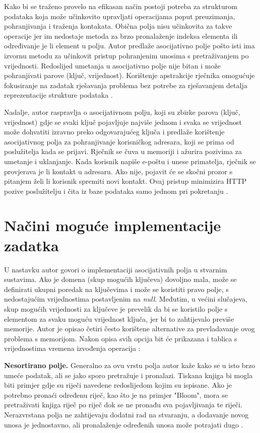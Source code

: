 \documentclass{foi}
\begin{document}
Kako bi se traženo provelo na efikasan način postoji potreba za strukturom podataka koja može učinkovito upravljati operacijama poput preuzimanja, pohranjivanja i traženja kontakata. Obična polja nisu učinkovita za takve operacije jer im nedostaje metoda za brzo pronalaženje indeksa elementa ili određivanje je li element u polju. Autor predlaže asocijativno polje pošto isti ima izvornu metodu za učinkovit pristup pohranjenim unosima s pretraživanjem po vrijednosti. Redoslijed umetanja u asocijativno polje nije bitan i može pohranjivati parove (ključ, vrijednost). Korištenje apstrakcije rječnika omogućuje fokusiranje na zadatak rješavanja problema bez potrebe za rješavanjem detalja reprezentacije strukture podataka \cite{la2021advanced}.

Nadalje, autor raspravlja o asocijativnom polju, koji su zbirke parova (ključ, vrijednost) gdje se svaki ključ pojavljuje najviše jednom i svaka se vrijednost može dohvatiti izravno preko odgovarajućeg ključa i predlaže korištenje asocijativnog polja za pohranjivanje korisničkog adresara, koji se prima od poslužitelja kada se prijavi. Rječnik se čuva u memoriji i ažurira pozivima za umetanje i uklanjanje. Kada korisnik napiše e-poštu i unese primatelja, rječnik se provjerava je li kontakt u adresaru. Ako nije, pojavit će se skočni prozor s pitanjem želi li korisnik spremiti novi kontakt. Ovaj pristup minimizira HTTP pozive poslužitelju i čita iz baze podataka samo jednom pri pokretanju \cite{la2021advanced}.

\section{Načini moguće implementacije zadatka}

U nastavku autor govori o implementaciji asocijativnih polja u stvarnim sustavima. Ako je domena (skup mogućih ključeva) dovoljno mala, može se definirati ukupni poredak na ključevima i može se koristiti pravo polje, s nedostajućim vrijednostima postavljenim na \textit{null}. Međutim, u većini slučajeva, skup mogućih vrijednosti za ključeve je prevelik da bi se koristilo polje s elementom za svaku moguću vrijednost ključa, jer bi to zahtijevalo previše memorije. Autor je opisao četiri često korištene alternative za prevladavanje ovog problema s memorijom. Nakon opisa svih opcija bit će prikazana i tablica s vrijednostima vremena izvođenja operacija \cite{la2021advanced}:

\textbf{Nesortirano polje.}
Generalno za ovu vrstu polja autor kaže kako se u isto brzo umeće podatak, ali se jako sporo pretražuje i pronalazi. Tiskana knjiga bi mogla biti primjer gdje su riječi navedene redoslijedom kojim su ispisane. Ako je potrebno pronaći određenu riječ, kao što je na primjer "Bloom", mora se pretraživati knjiga riječ po riječ dok se ne pronađu sva pojavljivanja te riječi. Nerazvrstana polja ne zahtijevaju dodatni rad na stvaranju, a dodavanje novog unosa je jednostavno, ali pronalaženje određenih unosa može potrajati dugo \cite{la2021advanced}.
\end{document}
